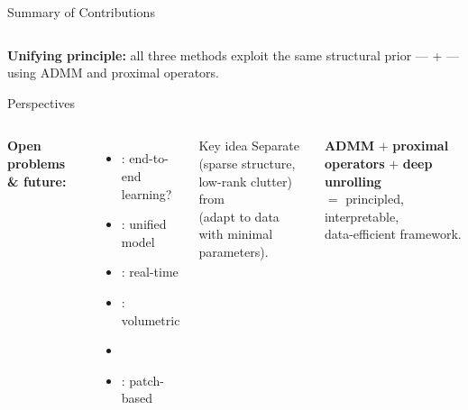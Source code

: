 \begin{frame}{Summary of Contributions}
\begin{columns}[T]
  \end{columns}

  \vspace{0.6em}
  \begin{shibuiwarning}
    \textbf{Unifying principle:}
    all three methods exploit the same structural prior ---
     + 
    --- using ADMM and proximal operators.
  \end{shibuiwarning}

\end{frame}

\begin{frame}{Perspectives}

  \begin{columns}[T]

      \textbf{Open problems \& future:}
      \vspace{0.15em}
      \begin{itemize}
        \setlength{\itemsep}{0.08em}
        \item {}: end-to-end learning?
        \pause
        \item {}: unified model
        \pause
        \item {}: real-time
        \pause
        \item {}: volumetric
        \pause
        \item {}
        \pause
        \item {}: patch-based
      \end{itemize}

      \vspace{0.5em}
      \begin{shibuiframe}{Key idea}
        \small
        Separate \\
        (sparse structure, low-rank clutter)\\
        from \\
        (adapt to data with minimal parameters).
      \end{shibuiframe}

      \vspace{0.8em}
      \small
      \textbf{ADMM}
      $+$ \textbf{proximal operators}
      $+$ \textbf{deep unrolling}\\[0.2em]
      $=$ principled, interpretable,\\
      \hphantom{$=$\;} data-efficient framework.

  \end{columns}

\end{frame}

